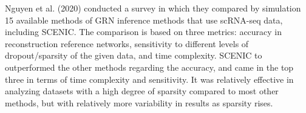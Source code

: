 Nguyen et al. (2020) \cite{nguyen2021comprehensive} conducted a survey in which they compared by simulation 15 available methods 
of GRN inference methods that use scRNA-seq data, including SCENIC. The comparison is based on three metrics: 
accuracy in reconstruction reference networks, sensitivity to different levels of dropout/sparsity of the given data, 
and time complexity. SCENIC to outperformed the other methods regarding the accuracy, and came in the top three in terms of 
time complexity and sensitivity. It was relatively effective in analyzing datasets with a high degree of sparsity compared to 
most other methods, but with relatively more variability in results as sparsity rises. 



